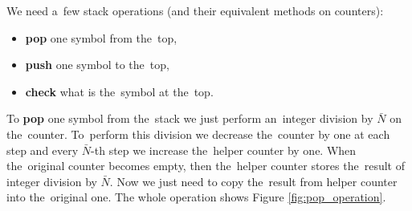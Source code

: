 \documentclass[english,shortabstract,mgr]{iithesis}
\begin{document}
We need a~few stack operations (and their equivalent
methods on counters):
\begin{itemize}
  \item \textbf{pop} one symbol from the~top,
  \item \textbf{push} one symbol to the~top,
  \item \textbf{check} what is the~symbol at the~top.
\end{itemize}

To \textbf{pop} one symbol from the~stack we just perform an~integer division by $\bar{N}$ on
the~counter. To~perform this division we decrease the~counter by one at each step and every
$\bar{N}$-th step we increase the~helper counter by one. When the~original counter becomes empty,
then the~helper counter stores the~result of integer division by $\bar{N}$. Now we just
need to copy the~result from helper counter into the~original one. The whole operation shows
Figure \ref{fig:pop_operation}.
\end{document}
